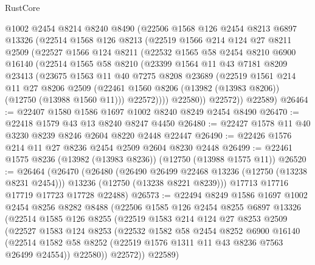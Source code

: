 \begin{lexlean}{RustCore}
\begin{coremodule}
    @1002
    @2454
    @8214
    @8240
    @8490
    (@22506
      @1568
      @126
      @2454
      @8213
      @6897
      @13326
      (@22514
        @1568
        @126
        @8213
        (@22519
          @1566
          @214
          @124
          @27
          @8211
          @2509
          (@22527
            @1566
            @124
            @8211
            (@22532
              @1565
              @58
              @2454
              @8210
              @6900
              @16140
              (@22514
                @1565
                @58
                @8210
                (@23399
                  @1564
                  @11
                  @43
                  @7181
                  @8209
                  @23413
                  (@23675
                    @1563
                    @11
                    @40
                    @7275
                    @8208
                    @23689
                    (@22519
                      @1561
                      @214
                      @11
                      @27
                      @8206
                      @2509
                      (@22461 @1560 @8206 (@13982 (@13983 @8206)) (@12750 (@13988 @1560 @11)))
                      @22572))))
              @22580))
          @22572))
      @22589)
@26464 := @22407 @1580 @1586 @1697 @1002 @8240 @8249 @2454 @8490
@26470 := @22418 @1579 @43 @13 @8240 @8247 @4450
@26480 := @22427 @1578 @11 @40 @3230 @8239 @8246 @2604 @8220 @2448 @22447
@26490 := @22426 @1576 @214 @11 @27 @8236 @2454 @2509 @2604 @8230 @2448
@26499 := @22461 @1575 @8236 (@13982 (@13983 @8236)) (@12750 (@13988 @1575 @11))
@26520 := @26464
    (@26470
      (@26480
        (@26490 @26499 @22468 @13236 (@12750 (@13238 @8231 @2454)))
        @13236
        (@12750 (@13238 @8221 @8239)))
      @17713
      @17716
      @17719
      @17723
      @17728
      @22488)
@26573 := @22494
    @8249
    @1586
    @1697
    @1002
    @2454
    @8256
    @8282
    @8488
    (@22506
      @1585
      @126
      @2454
      @8255
      @6897
      @13326
      (@22514
        @1585
        @126
        @8255
        (@22519
          @1583
          @214
          @124
          @27
          @8253
          @2509
          (@22527
            @1583
            @124
            @8253
            (@22532
              @1582
              @58
              @2454
              @8252
              @6900
              @16140
              (@22514 @1582 @58 @8252 (@22519 @1576 @1311 @11 @43 @8236 @7563 @26499 @24554))
              @22580))
          @22572))
      @22589)

\end{coremodule}
\end{lexlean}
